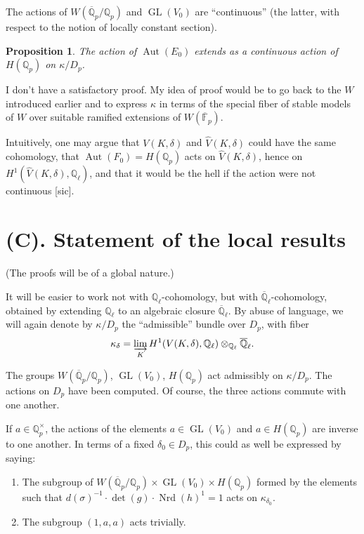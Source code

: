 \documentclass[11pt,a4paper]{article}
\theoremstyle{plain}
\newtheorem{proposition}[theorem]{Proposition}
\theoremstyle{definition}
\theoremstyle{remark}
\DeclareMathOperator{\Aut}{Aut}
\DeclareMathOperator{\GL}{GL}
\DeclareMathOperator{\Nrd}{Nrd}
\newcommand{\Qpbar}{\overline{\mathbb{Q}}_{p}}
\newcommand{\Fpbar}{\overline{\mathbb{F}}_{p}}
\newcommand{\Qp}{\mathbb{Q}_{p}}
\newcommand{\Ql}{\mathbb{Q}_{\ell}}
\newcommand{\Qlbar}{\overline{\mathbb{Q}}_{\ell}}
\begin{document}
The actions of $W(\Qpbar/\Qp)$ and $\GL(V_{0})$ are ``continuous'' (the latter, with respect to the notion of locally constant section).

\begin{proposition}
The action of $\Aut(E_{0})$ extends as a continuous action of $H(\Qp)$ on $\kappa/D_{p}$.
\end{proposition}

I don't have a satisfactory proof. My idea of proof would be to go back to the $W$ introduced earlier and to express $\kappa$ in terms of the special fiber of stable models of $W$ over suitable ramified extensions of $W(\Fpbar)$.

Intuitively, one may argue that $V(K, \delta)$ and $\widehat{V}(K, \delta)$ could have the same cohomology, that $\Aut(F_{0}) = H(\Qp)$ acts on $\widehat{V}(K, \delta)$, hence on $H^{1}(\widehat{V}(K, \delta), \Ql)$, and that it would be the hell if the action were not continuous [sic].


\section*{(C). Statement of the local results}

(The proofs will be of a global nature.)

It will be easier to work not with $\Ql$-cohomology, but with $\Qlbar$-cohomology, obtained by extending $\Ql$ to an algebraic closure $\Qlbar$. By abuse of language, we will again denote by $\kappa/D_{p}$ the ``admissible'' bundle over $D_{p}$, with fiber
\[
\kappa_{\delta} = \varinjlim_{K} H^{1}(V(K, \delta), \Ql) \otimes_{\Ql} \Qlbar.
\]

The groups $W(\Qpbar/\Qp)$, $\GL(V_{0})$, $H(\Qp)$ act admissibly on $\kappa/D_{p}$. The actions on $D_{p}$ have been computed. Of course, the three actions commute with one another.

If $a \in \Qp^{\times}$, the actions of the elements $a \in \GL(V_{0})$ and $a \in H(\Qp)$ are inverse to one another. In terms of a fixed $\delta_{0} \in D_{p}$, this could as well be expressed by saying:
\begin{enumerate}[label=(\alph*)]
\item The subgroup of $W(\Qpbar/\Qp) \times \GL(V_{0}) \times H(\Qp)$ formed by the elements such that $d(\sigma)^{-1} \cdot \det(g) \cdot \Nrd(h)^{1} = 1$ acts on $\kappa_{\delta_{0}}$.
\item The subgroup $(1, a, a)$ acts trivially.
\end{enumerate}
\end{document}
